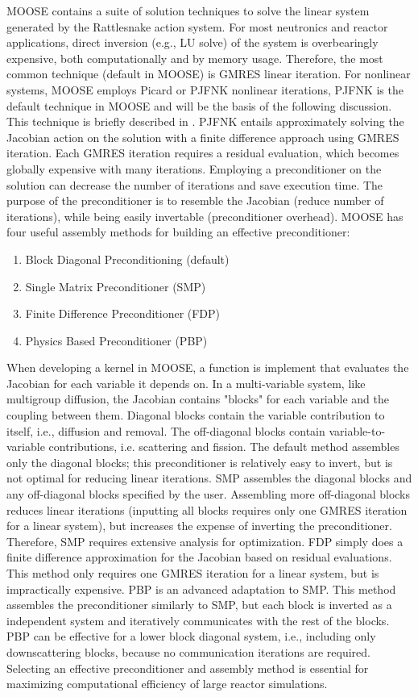 MOOSE contains a suite of solution techniques to solve the linear system generated by the Rattlesnake action system. For most neutronics and reactor applications, direct inversion (e.g., LU solve) of the system is overbearingly expensive, both computationally and by memory usage. Therefore, the most common technique (default in MOOSE) is GMRES linear iteration. For nonlinear systems, MOOSE employs Picard or PJFNK nonlinear iterations, PJFNK is the default technique in MOOSE and will be the basis of the following discussion. This technique is briefly described in . PJFNK entails approximately solving the Jacobian action on the solution with a finite difference approach using GMRES iteration. Each GMRES iteration requires a residual evaluation, which becomes globally expensive with many iterations. Employing a preconditioner on the solution can decrease the number of iterations and save execution time. The purpose of the preconditioner is to resemble the Jacobian (reduce number of iterations), while being easily invertable (preconditioner overhead). MOOSE has four useful assembly methods for building an effective preconditioner:

\begin{enumerate}
\item Block Diagonal Preconditioning (default)
\item Single Matrix Preconditioner (SMP)
\item Finite Difference Preconditioner (FDP)
\item Physics Based Preconditioner (PBP)
\end{enumerate}

When developing a kernel in MOOSE, a function is implement that evaluates the Jacobian for each variable it depends on. In a multi-variable system, like multigroup diffusion, the Jacobian contains "blocks" for each variable and the coupling between them. Diagonal blocks contain the variable contribution to itself, i.e., diffusion and removal. The off-diagonal blocks contain variable-to-variable contributions, i.e. scattering and fission. The default method assembles only the diagonal blocks; this preconditioner is relatively easy to invert, but is not optimal for reducing linear iterations. SMP assembles the diagonal blocks and any off-diagonal blocks specified by the user. Assembling more off-diagonal blocks reduces linear iterations (inputting all blocks requires only one GMRES iteration for a linear system), but increases the expense of inverting the preconditioner. Therefore, SMP requires extensive analysis for optimization. FDP simply does a finite difference approximation for the Jacobian based on residual evaluations. This method only requires one GMRES iteration for a linear system, but is impractically expensive. PBP is an advanced adaptation to SMP. This method assembles the preconditioner similarly to SMP, but each block is inverted as a independent system and iteratively communicates with the rest of the blocks. PBP can be effective for a lower block diagonal system, i.e., including only downscattering blocks, because no communication iterations are required. Selecting an effective preconditioner and assembly method is essential for maximizing computational efficiency of large reactor simulations.
